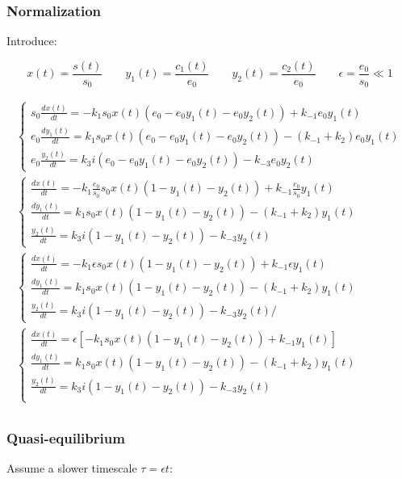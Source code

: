     \subsubsection{Normalization}
    Introduce:

    $$x(t) = \frac{s(t)}{s_0}\qquad y_1(t) = \frac{c_1(t)}{e_0}\qquad y_2(t) = \frac{c_2(t)}{e_0}\qquad \epsilon = \frac{e_0}{s_0}\ll 1$$

    \begin{align*}
      \begin{cases}
        s_0\frac{dx(t)}{dt} = -k_1s_0x(t)(e_0-e_0y_1(t) - e_0y_2(t)) + k_{-1}e_0y_1(t)\\
        e_0\frac{dy_1(t)}{dt} = k_1s_0x(t)(e_0-e_0y_1(t) - e_0y_2(t)) - (k_{-1}+k_2)e_0y_1(t)\\
        e_0\frac{y_2(t)}{dt} = k_3i(e_0-e_0y_1(t)-e_0y_2(t))-k_{-3}e_0y_2(t)
      \end{cases}\\
      \begin{cases}
        \frac{dx(t)}{dt} = -k_1\frac{e_0}{s_0}s_0x(t)(1-y_1(t) -y_2(t)) + k_{-1}\frac{e_0}{s_0}y_1(t)\\
        \frac{dy_1(t)}{dt} = k_1s_0x(t)(1-y_1(t) -y_2(t)) - (k_{-1}+k_2)y_1(t)\\
        \frac{y_2(t)}{dt} = k_3i(1-y_1(t)-y_2(t))-k_{-3}y_2(t)
      \end{cases}\\
      \begin{cases}
        \frac{dx(t)}{dt} = -k_1\epsilon s_0x(t)(1-y_1(t) -y_2(t)) + k_{-1}\epsilon y_1(t)\\
        \frac{dy_1(t)}{dt} = k_1s_0x(t)(1-y_1(t) -y_2(t)) - (k_{-1}+k_2)y_1(t)\\
        \frac{y_2(t)}{dt} = k_3i(1-y_1(t)-y_2(t))-k_{-3}y_2(t)/
      \end{cases}\\
      \begin{cases}
        \frac{dx(t)}{dt} = \epsilon\left[-k_1s_0x(t)(1-y_1(t) -y_2(t)) + k_{-1}y_1(t)\right]\\
        \frac{dy_1(t)}{dt} = k_1s_0x(t)(1-y_1(t) -y_2(t)) - (k_{-1}+k_2)y_1(t)\\
        \frac{y_2(t)}{dt} = k_3i(1-y_1(t)-y_2(t))-k_{-3}y_2(t)\\
      \end{cases}\\
    \end{align*}

    \subsubsection{Quasi-equilibrium}
    Assume a slower timescale $\tau = \epsilon t$:


